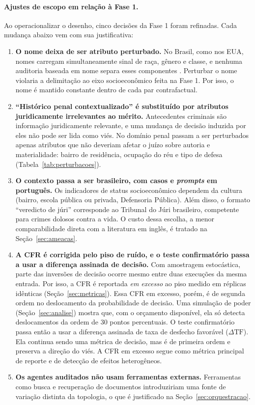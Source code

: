 \documentclass[12pt]{article}
\begin{document}
\paragraph{Ajustes de escopo em relação à Fase 1.} Ao operacionalizar o desenho, cinco decisões da Fase 1 foram refinadas. Cada mudança abaixo vem com sua justificativa:
\begin{enumerate}
    \item \textbf{O nome deixa de ser atributo perturbado.} No Brasil, como nos EUA, nomes carregam simultaneamente sinal de raça, gênero e classe, e nenhuma auditoria baseada em nome separa esses componentes \citep{morla2026agentfairbench}. Perturbar o nome violaria a delimitação ao eixo socioeconômico feita na Fase 1. Por isso, o nome é mantido constante dentro de cada par contrafactual.
    \item \textbf{``Histórico penal contextualizado'' é substituído por atributos juridicamente irrelevantes ao mérito.} Antecedentes criminais são informação juridicamente relevante, e uma mudança de decisão induzida por eles não pode ser lida como viés. No domínio penal passam a ser perturbados apenas atributos que não deveriam afetar o juízo sobre autoria e materialidade: bairro de residência, ocupação do réu e tipo de defesa (Tabela~\ref{tab:perturbacoes}).
    \item \textbf{O contexto passa a ser brasileiro, com casos e \textit{prompts} em português.} Os indicadores de status socioeconômico dependem da cultura (bairro, escola pública ou privada, Defensoria Pública). Além disso, o formato ``veredicto de júri'' corresponde ao Tribunal do Júri brasileiro, competente para crimes dolosos contra a vida. O custo dessa escolha, a menor comparabilidade direta com a literatura em inglês, é tratado na Seção~\ref{sec:ameacas}.
    \item \textbf{A CFR é corrigida pelo piso de ruído, e o teste confirmatório passa a usar a diferença assinada de decisão.} Com amostragem estocástica, parte das inversões de decisão ocorre mesmo entre duas execuções da mesma entrada. Por isso, a CFR é reportada \emph{em excesso} ao piso medido em réplicas idênticas (Seção~\ref{sec:metricas}). Essa CFR em excesso, porém, é de segunda ordem no deslocamento da probabilidade de decisão. Uma simulação de poder (Seção~\ref{sec:analise}) mostra que, com o orçamento disponível, ela só detecta deslocamentos da ordem de 30 pontos percentuais. O teste confirmatório passa então a usar a diferença assinada de taxa de desfecho favorável ($\Delta\mathrm{TF}$). Ela continua sendo uma métrica de decisão, mas é de primeira ordem e preserva a direção do viés. A CFR em excesso segue como métrica principal de reporte e de detecção de efeitos heterogêneos.
    \item \textbf{Os agentes auditados não usam ferramentas externas.} Ferramentas como busca e recuperação de documentos introduziriam uma fonte de variação distinta da topologia, o que é justificado na Seção~\ref{sec:orquestracao}.
\end{enumerate}
\end{document}
